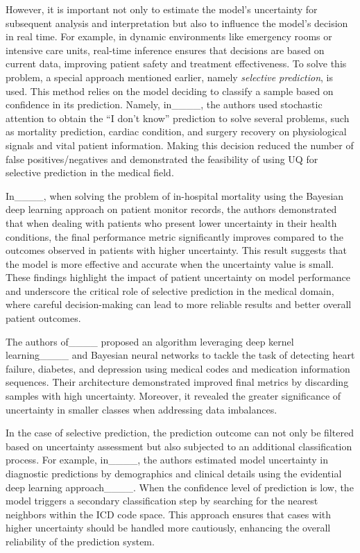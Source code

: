   However, it is important not only to estimate the model's uncertainty for subsequent analysis and interpretation but also to influence the model's decision in real time. For example, in dynamic environments like emergency rooms or intensive care units, real-time inference ensures that decisions are based on current data, improving patient safety and treatment effectiveness. To solve this problem, a special approach mentioned earlier, namely \textit{selective prediction}, is used. This method relies on the model deciding to classify a sample based on confidence in its prediction. Namely, in____, the authors used stochastic attention to obtain the ``I don't know'' prediction to solve several problems, such as mortality prediction, cardiac condition, and surgery recovery on physiological signals and vital patient information. Making this decision reduced the number of false positives/negatives and demonstrated the feasibility of using UQ for selective prediction in the medical field.
  
  In____, when solving the problem of in-hospital mortality using the Bayesian deep learning approach on patient monitor records, the authors demonstrated that when dealing with patients who present lower uncertainty in their health conditions, the final performance metric significantly improves compared to the outcomes observed in patients with higher uncertainty. This result suggests that the model is more effective and accurate when the uncertainty value is small. These findings highlight the impact of patient uncertainty on model performance and underscore the critical role of selective prediction in the medical domain, where careful decision-making can lead to more reliable results and better overall patient outcomes.

  The authors of____ proposed an algorithm leveraging deep kernel learning____ and Bayesian neural networks to tackle the task of detecting heart failure, diabetes, and depression using medical codes and medication information sequences. Their architecture demonstrated improved final metrics by discarding samples with high uncertainty. Moreover, it revealed the greater significance of uncertainty in smaller classes when addressing data imbalances.

  In the case of selective prediction, the prediction outcome can not only be filtered based on uncertainty assessment but also subjected to an additional classification process. For example, in____, the authors estimated model uncertainty in diagnostic predictions by demographics and clinical details using the evidential deep learning approach____. When the confidence level of prediction is low, the model triggers a secondary classification step by searching for the nearest neighbors within the ICD code space. This approach ensures that cases with higher uncertainty should be handled more cautiously, enhancing the overall reliability of the prediction system.

